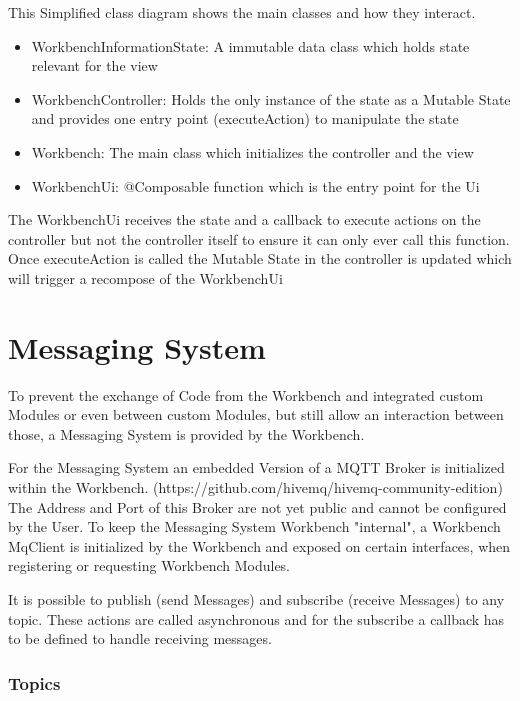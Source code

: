 This Simplified class diagram shows the main classes and how they interact.
\begin{itemize}
    \item WorkbenchInformationState: A immutable data class which holds state relevant for the view
    \item WorkbenchController: Holds the only instance of the state as a Mutable State and provides one entry point (executeAction) to manipulate the state
    \item Workbench: The main class which initializes the controller and the view
    \item WorkbenchUi: @Composable function which is the entry point for the Ui
\end{itemize}

The WorkbenchUi receives the state and a callback to execute actions on the controller but not the controller itself to ensure it can only ever call this function. Once executeAction is called the Mutable State in the controller is updated which will trigger a recompose of the WorkbenchUi


\section{Messaging System}
To prevent the exchange of Code from the Workbench and integrated custom Modules or even between custom Modules, but still allow an interaction between those, a Messaging System is provided by the Workbench. 

For the Messaging System an embedded Version of a MQTT Broker is initialized within the Workbench. (https://github.com/hivemq/hivemq-community-edition)
The Address and Port of this Broker are not yet public and cannot be configured by the User. To keep the Messaging System Workbench "internal", a Workbench MqClient is initialized by the Workbench and exposed on certain interfaces, when registering or requesting Workbench Modules.

It is possible to publish (send Messages) and subscribe (receive Messages) to any topic. These actions are called asynchronous and for the subscribe a callback has to be defined to handle receiving messages.

\subsubsection{Topics}

